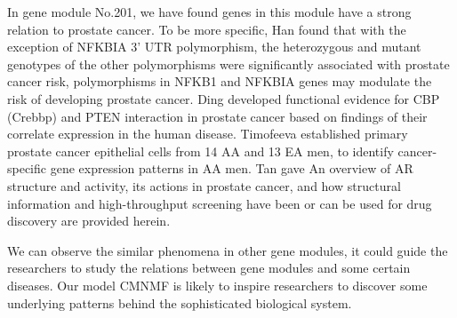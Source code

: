 \documentclass{bmcart}
\begin{document}
In gene module No.201, we have found genes in this module have a strong relation to prostate cancer. To be more specific, Han \cite{Han2015} found that with the exception of NFKBIA 3' UTR polymorphism, the heterozygous and mutant genotypes of the other polymorphisms were significantly associated with prostate cancer risk, polymorphisms in NFKB1 and NFKBIA genes may modulate the risk of developing prostate cancer. Ding \cite{Ding2014} developed functional evidence for CBP (Crebbp) and PTEN interaction in prostate cancer based on findings of their correlate expression in the human disease.  Timofeeva \cite{Timofeeva2009} established primary prostate cancer epithelial cells from 14 AA and 13 EA men, to identify cancer-specific gene expression patterns in AA men.
Tan \cite{Tan2015} gave An overview of AR structure and activity, its actions in prostate cancer, and how structural information and high-throughput screening have been or can be used for drug discovery are provided herein.

We can observe the similar phenomena in other gene modules, it could guide the researchers to study the relations between gene modules and some certain diseases. Our model CMNMF is likely to inspire researchers to discover some underlying patterns behind the sophisticated biological system.
\end{document}
